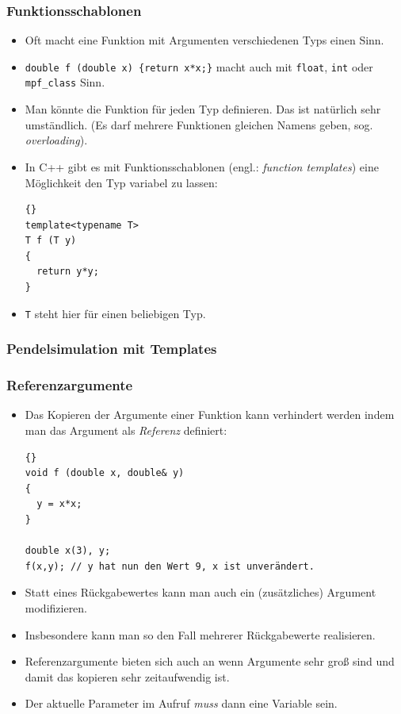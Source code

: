 \documentclass[ignorenonframetext,12pt]{beamer}
\theoremstyle{definition}
\theoremstyle{definition}
\begin{document}
\begin{frame}[fragile]
\frametitle{Funktionsschablonen}
\begin{itemize}
\item Oft macht eine Funktion mit Argumenten verschiedenen Typs einen Sinn.
\item \lstinline!double f (double x) {return x*x;}! macht auch mit
  \lstinline{float}, \lstinline{int} oder \lstinline{mpf_class} Sinn.
\item Man könnte die Funktion für jeden Typ definieren. Das ist
  natürlich sehr umständlich. (Es darf mehrere Funktionen gleichen
  Namens geben, sog. \textsl{overloading}).
\item In C++ gibt es mit Funktionsschablonen (engl.: \textsl{function
  templates}) eine Möglichkeit den Typ variabel zu lassen:
{\scriptsize\begin{lstlisting}{}
template<typename T>
T f (T y)
{
  return y*y;
}
\end{lstlisting}}
\item \lstinline{T} steht hier für einen beliebigen Typ.
\end{itemize}
\end{frame}

\begin{frame}
\frametitle{Pendelsimulation mit Templates}

\end{frame}

\begin{frame}[fragile]
\frametitle{Referenzargumente}
\begin{itemize}
\item Das Kopieren der Argumente einer Funktion kann verhindert werden
  indem man das Argument als \textsl{Referenz} definiert:
{\scriptsize\begin{lstlisting}{}
void f (double x, double& y)
{
  y = x*x;
}

double x(3), y;
f(x,y); // y hat nun den Wert 9, x ist unverändert.
\end{lstlisting}}
\item Statt eines Rückgabewertes kann man auch ein (zusätzliches)
  Argument modifizieren.
\item Insbesondere kann man so den Fall mehrerer Rückgabewerte
  realisieren.
\item Referenzargumente bieten sich auch an wenn Argumente \glqq{}sehr
  groß\grqq{} sind und damit das kopieren sehr zeitaufwendig ist.
\item Der aktuelle Parameter im Aufruf \textsl{muss} dann eine Variable sein.
\end{itemize}
\end{frame}
\end{document}
